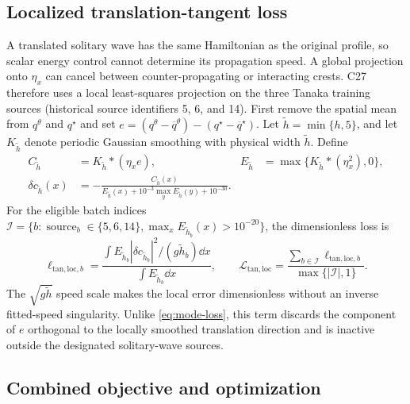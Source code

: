 \subsection{Localized translation-tangent loss}
\label{sec:tangent-loss}

A translated solitary wave has the same Hamiltonian as the original profile,
so scalar energy control cannot determine its propagation speed.  A global
projection onto $\eta_x$ can cancel between counter-propagating or interacting
crests.  C27 therefore uses a local least-squares projection on the three
Tanaka training sources (historical source identifiers 5, 6, and 14).  First
remove the spatial mean from $q^\theta$ and $q^\star$ and set
$e=(q^\theta-\overline q^\theta)-(q^\star-\overline q^\star)$. Let
$\widetilde h=\min\{h,5\}$, and let $K_{\widetilde h}$ denote periodic Gaussian
smoothing with physical width $\widetilde h$. Define
\begin{align}
  C_{\widetilde h}&=K_{\widetilde h}*(\eta_x e),
  &E_{\widetilde h}&=\max\{K_{\widetilde h}*(\eta_x^2),0\},\\
  \delta c_{\widetilde h}(x)
  &=-\frac{C_{\widetilde h}(x)}
  {E_{\widetilde h}(x)+10^{-3}\max_y E_{\widetilde h}(y)+10^{-30}}.
  \label{eq:localized-speed-error}
\end{align}
For the eligible batch indices
$\mathcal I=\{b:\operatorname{source}_b\in\{5,6,14\},
\max_x E_{\widetilde h_b}(x)>10^{-20}\}$, the dimensionless loss is
\begin{equation}
  \ell_{\mathrm{tan,loc},b}
  =\frac{\int E_{\widetilde h_b}|\delta c_{\widetilde h_b}|^2/
  (g\widetilde h_b)\dd x}{\int E_{\widetilde h_b}\dd x},
  \qquad
  \mathcal L_{\mathrm{tan,loc}}
  =\frac{\sum_{b\in\mathcal I}\ell_{\mathrm{tan,loc},b}}
  {\max\{|\mathcal I|,1\}}.
  \label{eq:localized-tangent-loss}
\end{equation}
The $\sqrt{g\widetilde h}$ speed scale makes the local error dimensionless without an
inverse fitted-speed singularity.  Unlike \eqref{eq:mode-loss}, this term
discards the component of $e$ orthogonal to the locally smoothed translation
direction and is inactive outside the designated solitary-wave sources.

\subsection{Combined objective and optimization}

